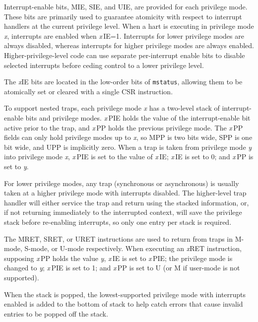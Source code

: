Interrupt-enable bits, MIE, SIE, and UIE, are provided for each privilege
mode.  These bits are primarily used to guarantee atomicity with respect to
interrupt handlers at the current privilege level.  When a hart is executing
in privilege mode {\em x}, interrupts are enabled when {\em x}\,IE=1.
Interrupts for lower privilege modes are always disabled, whereas interrupts
for higher privilege modes are always enabled.  Higher-privilege-level code
can use separate per-interrupt enable bits to disable selected interrupts
before ceding control to a lower privilege level.

\begin{commentary}
The {\em x}IE bits are located in the low-order bits of {\tt mstatus},
allowing them to be atomically set or cleared with a single CSR
instruction.
\end{commentary}

To support nested traps, each privilege mode {\em x} has a two-level
stack of interrupt-enable bits and privilege modes.  {\em x}\,PIE
holds the value of the interrupt-enable bit active prior to the trap,
and {\em x}\,PP holds the previous privilege mode.  The {\em x}\,PP
fields can only hold privilege modes up to {\em x}, so MPP is
two bits wide, SPP is one bit wide, and UPP is implicitly zero.  When
a trap is taken from privilege mode {\em y} into privilege mode {\em
  x}, {\em x}\,PIE is set to the value of {\em x}\,IE; {\em x}\,IE is set to
0; and {\em x}\,PP is set to {\em y}.

\begin{commentary}
For lower privilege modes, any trap (synchronous or asynchronous) is
usually taken at a higher privilege mode with interrupts disabled.
The higher-level trap handler will either service the trap and return
using the stacked information, or, if not returning immediately to the
interrupted context, will save the privilege stack before re-enabling
interrupts, so only one entry per stack is required.
\end{commentary}

The MRET, SRET, or URET instructions are used to return from
traps in M-mode, S-mode, or U-mode respectively.  When
executing an {\em x}RET instruction, supposing {\em x}\,PP holds the
value {\em y}, {\em x}\,IE is set to {\em x}\,PIE; the privilege mode
is changed to {\em y}; {\em x}\,PIE is set to 1; and {\em x}\,PP is
set to U (or M if user-mode is not supported).

\begin{commentary}
When the stack is popped, the lowest-supported privilege mode with
interrupts enabled is added to the bottom of stack to help catch
errors that cause invalid entries to be popped off the stack.
\end{commentary}

